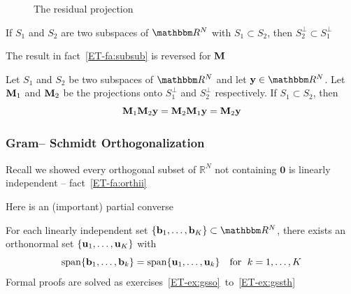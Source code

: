 \begin{frame}
    
    \vspace{2em}
    \begin{figure}
       \begin{center}
        
        \caption{\label{f:orth_proj2D} The residual projection}
       \end{center}
    \end{figure}
    
\end{frame}


\begin{frame}

    \vspace{2em}
    If $S_1$ and $S_2$ are two subspaces of $\RR^N$ with $S_1 \subset S_2$, 
    then $S_2^{\perp} \subset S_1^{\perp}$

    The result in
    fact~\ref{ET-fa:subsub} is reversed for $\mathbf M$
    
    \vspace{.7em}
    \Fact{\eqref{ET-fa:subsub2}}
    Let $S_1$ and $S_2$ be two subspaces of $\RR^N$ and let 
    $\boldy \in \RR^N$.  Let $\mathbf M_1$ and $\mathbf M_2$ be the projections onto $S_1^{\perp}$
    and $S_2^{\perp}$ respectively.  If $S_1 \subset S_2$, then
    \begin{equation*}
        \mathbf M_1 \mathbf M_2 {\mathbf y} = \mathbf M_2 \mathbf M_1 {\mathbf y} = \mathbf M_2 {\mathbf y}
    \end{equation*}
        
\end{frame}

\begin{frame}\frametitle{Gram-- Schmidt Orthogonalization} 

    \vspace{2em}
    Recall we showed every orthogonal subset of $\mathbb{R}^{N}$ not 
    containing $\textbf{0}$ is linearly independent -- fact~\ref{ET-fa:orthii}
    
    Here is an (important) partial converse 
    
    \vspace{.7em}
    \Thm{\eqref{ET-t:gso}}
    For each linearly independent set $\{\boldb_1, \ldots, \boldb_K\} \subset 
    \RR^N$, there exists an orthonormal set $\{{\mathbf u}_1, \ldots, {\mathbf u}_K\}$
    with
    \begin{equation*}
        \operatorname{span} \{{\mathbf b}_1, \ldots, {\mathbf b}_k\}
        = 
        \operatorname{span} \{{\mathbf u}_1, \ldots, {\mathbf u}_k\}
        \quad \text{for } \;
        k = 1, \ldots, K
    \end{equation*}
    Formal proofs are solved as exercises~\ref{ET-ex:gsso}~to~\ref{ET-ex:gssth}
    
\end{frame}



